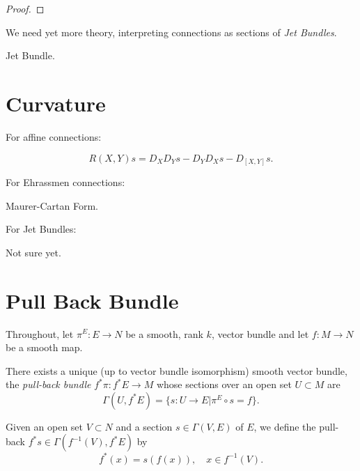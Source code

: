 \documentclass{amsart}
\begin{document}
\begin{proof}

\end{proof}

We need yet more theory, interpreting connections as sections of \emph{Jet Bundles}.

\begin{defn}
Jet Bundle.
\end{defn}

\section{Curvature}

For affine connections:

\begin{defn}
\[
R(X, Y) s = D_X D_Y s - D_Y D_X s - D_{[X, Y]} s.
\]
\end{defn}

For Ehrassmen connections:

\begin{defn}
Maurer-Cartan Form.
\end{defn}

For Jet Bundles:

\begin{defn}
Not sure yet.
\end{defn}

\section{Pull Back Bundle}

Throughout, let \(\pi^E : E \to N\) be a smooth, rank \(k\), vector bundle and let \(f : M \to N\) be a smooth map.

\begin{lemma}
There exists a unique (up to vector bundle isomorphism) smooth vector bundle, the \emph{pull-back bundle} \(f^{\ast} \pi : f^{\ast}E \to M\) whose sections over an open set \(U  \subset M\) are
\[
\Gamma(U, f^{\ast} E) = \{s : U \to E | \pi^E \circ s = f\}.
\]
\end{lemma}

\begin{defn}
Given an open set \(V \subset N\) and a section \(s \in \Gamma(V, E)\) of \(E\), we define the pull-back \(f^{\ast} s \in \Gamma(f^{-1}(V), f^{\ast} E)\) by
\[
f^{\ast} (x) = s(f(x)), \quad x \in f^{-1}(V).
\]
\end{defn}
\end{document}
